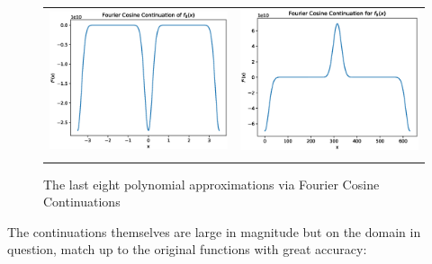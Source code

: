 \documentclass[11pt]{amsart}
\begin{document}
\begin{figure}
\begin{tabular}{|c|c|}
\\ \\
\hline
\includegraphics[scale=.4]{f_8Cosine.eps}
& 
\includegraphics[scale=.4]{f_9Cosine.eps}
\\ \\



\end{tabular}
\caption{The last eight polynomial approximations via Fourier Cosine Continuations}
\end{figure}
\newpage 
The continuations themselves are large in magnitude but on the domain in question, match up to the original functions with great accuracy:
\end{document}
